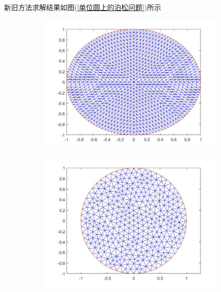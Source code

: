             新旧方法求解结果如图(\ref{单位圆上的泊松问题})所示
            \begin{figure}[H]
                \centering
                \begin{subfigure}[b]{0.4\textwidth}
                    \includegraphics[width=\textwidth]{images/PDE_example_oldmethod_wangge.jpg}
                \end{subfigure}
                \begin{subfigure}[b]{0.4\textwidth}
                    \includegraphics[width=\textwidth]{images/PDE_example_newmethod_wangge.jpg}

\end{subfigure}
\end{figure}
